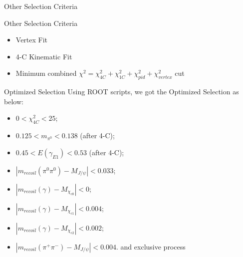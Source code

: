 \documentclass{beamer}
\begin{document}
\begin{frame}{Other Selection Criteria}
\begin{block}{Other Selection Criteria}
\begin{itemize}
\item Vertex Fit
\item 4-C Kinematic Fit
\item Minimum combined ${\chi}^2={\chi}_{4C}^2+{\chi}_{1C}^2+{\chi}_{pid}^2+{\chi}_{vertex}^2$ cut
\end{itemize}
\end{block}
\end{frame}
\begin{frame}{Optimized Selection}
Using ROOT scripts, we got the Optimized Selection as below:
\begin{itemize}
\item $0<\chi_{4C}^2<25$;
\item $0.125<m_{\pi^0}<0.138$ (after 4-C);
\item $0.45<E(\gamma_{E1})<0.53$ (after 4-C);
\item $|m_{recoil}(\pi^0 \pi^0)-M_{J/\psi}|<0.033$;
\item $|m_{recoil}(\gamma)-M_{\chi_{c0}}|<0$;
\item $|m_{recoil}(\gamma)-M_{\chi_{c1}}|<0.004$;
\item $|m_{recoil}(\gamma)-M_{\chi_{c2}}|<0.002$;
\item $|m_{recoil}(\pi^+ \pi^-)-M_{J/\psi}|<0.004$. and exclusive process
\end{itemize}
\end{frame}
\end{document}
